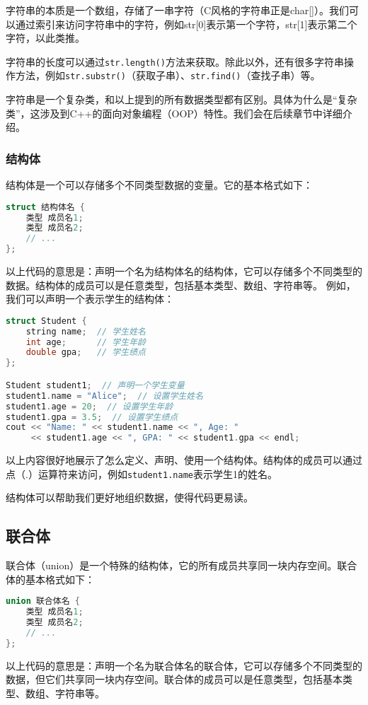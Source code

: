 \documentclass[../main.tex]{subfiles}
\begin{document}
字符串的本质是一个数组，存储了一串字符（C风格的字符串正是char[]）。我们可以通过索引来访问字符串中的字符，例如str[0]表示第一个字符，str[1]表示第二个字符，以此类推。

字符串的长度可以通过\texttt{str.length()}方法来获取。除此以外，还有很多字符串操作方法，例如\texttt{str.substr()}（获取子串）、\texttt{str.find()}（查找子串）等。

字符串是一个复杂类，和以上提到的所有数据类型都有区别。具体为什么是“复杂类”，这涉及到C++的面向对象编程（OOP）特性。我们会在后续章节中详细介绍。

\subsubsection{结构体}
结构体是一个可以存储多个不同类型数据的变量。它的基本格式如下：
\begin{lstlisting}[language=C++]
struct 结构体名 {
    类型 成员名1;
    类型 成员名2;
    // ...
};
\end{lstlisting}
以上代码的意思是：声明一个名为结构体名的结构体，它可以存储多个不同类型的数据。结构体的成员可以是任意类型，包括基本类型、数组、字符串等。
例如，我们可以声明一个表示学生的结构体：
\begin{lstlisting}[language=C++]
struct Student {
    string name;  // 学生姓名
    int age;      // 学生年龄
    double gpa;   // 学生绩点
};

Student student1;  // 声明一个学生变量
student1.name = "Alice";  // 设置学生姓名
student1.age = 20;  // 设置学生年龄
student1.gpa = 3.5;  // 设置学生绩点
cout << "Name: " << student1.name << ", Age: "
     << student1.age << ", GPA: " << student1.gpa << endl;
\end{lstlisting}

以上内容很好地展示了怎么定义、声明、使用一个结构体。结构体的成员可以通过点（.）运算符来访问，例如\texttt{student1.name}表示学生1的姓名。

结构体可以帮助我们更好地组织数据，使得代码更易读。

\subsection{联合体}

联合体（union）是一个特殊的结构体，它的所有成员共享同一块内存空间。联合体的基本格式如下：
\begin{lstlisting}[language=C++]
union 联合体名 {
    类型 成员名1;
    类型 成员名2;
    // ...
};
\end{lstlisting}
以上代码的意思是：声明一个名为联合体名的联合体，它可以存储多个不同类型的数据，但它们共享同一块内存空间。联合体的成员可以是任意类型，包括基本类型、数组、字符串等。
\end{document}
